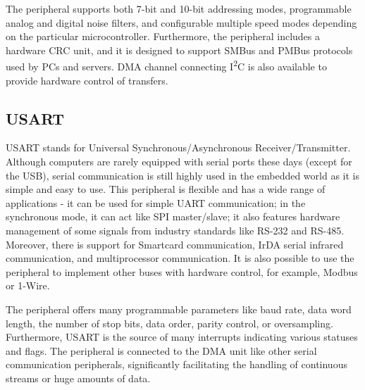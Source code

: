 The peripheral supports both 7-bit and 10-bit addressing modes, programmable analog and digital noise filters, and configurable multiple speed modes depending on the particular microcontroller. Furthermore, the peripheral includes a hardware CRC unit, and it is designed to support SMBus and PMBus protocols used by PCs and servers. DMA channel connecting I\textsuperscript{2}C is also available to provide hardware control of transfers.

	\subsection{USART}
	\label{sub:usart}
USART stands for Universal Synchronous/Asynchronous Receiver/Transmitter. Although computers are rarely equipped with serial ports these days (except for the USB), serial communication is still highly used in the embedded world as it is simple and easy to use. This peripheral is flexible and has a wide range of applications - it can be used for simple UART communication; in the synchronous mode, it can act like SPI master/slave; it also features hardware management of some signals from industry standards like RS-232 and RS-485. Moreover, there is support for Smartcard communication, IrDA serial infrared communication, and multiprocessor communication. It is also possible to use the peripheral to implement other buses with hardware control, for example, Modbus or 1-Wire.  

The peripheral offers many programmable parameters like baud rate, data word length, the number of stop bits, data order, parity control, or oversampling. Furthermore, USART is the source of many interrupts indicating various statuses and flags. The peripheral is connected to the DMA unit like other serial communication peripherals, significantly facilitating the handling of continuous streams or huge amounts of data.